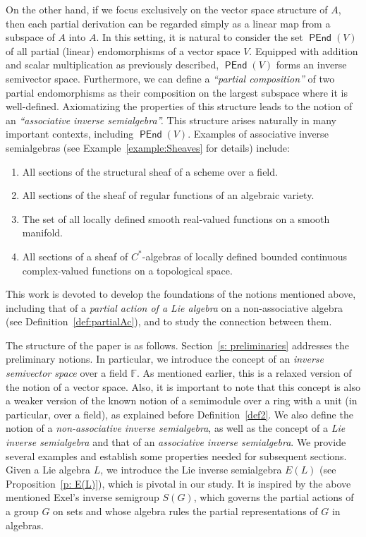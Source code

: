 \documentclass[10pt,a4paper]{amsart}
\theoremstyle{definition}
\theoremstyle{remark}
\numberwithin{equation}{section}
\newtheorem*{Theorem A}{\textbf{Theorem A}}
\newtheorem*{Corollary E}{\textbf{Corollary E}}
\newtheorem*{Corollary F}{\textbf{Corollary F}}
\newtheorem*{Theorem B}{\textbf{Theorem B}}
\newtheorem*{Theorem C}{\textbf{Theorem C}}
\newtheorem*{Theorem D}{\textbf{Theorem B}}
\newtheorem*{p a}{\textbf{Proof of  Theorem A}}
\newtheorem*{p b}{\textbf{Proof of Theorem B}}
\newtheorem*{p c}{\textbf{Proof of  Theorem C}}
\newtheorem*{p d}{\textbf{Proof of  Theorem D}}
\newcommand{\F}{\mathbb{F}}
\newcommand{\0}{{\vartheta}}
\DeclareMathOperator{\pen}{\textsf{PEnd}}
\begin{document}
On the other hand, if we focus exclusively on the vector space structure of $A$, then each partial derivation can be regarded simply as a linear map from a subspace of $A$ into $A$. In this setting, it is natural to consider the set $\pen(V)$ of all partial (linear) endomorphisms of a vector space $V.$ Equipped with addition and scalar multiplication as previously described, $\pen(V)$ forms an inverse semivector space. Furthermore, we can define a {\em ``partial composition''} of two partial endomorphisms as their composition on the largest subspace where it is well-defined. Axiomatizing the properties of this structure leads to the notion of an {\em ``associative inverse semialgebra''.} This structure arises naturally in many important contexts,  including  $\pen(V).$ Examples of associative inverse semialgebras (see Example~\ref{example:Sheaves} for details)
include:
\begin{enumerate}
\item  All sections of the structural sheaf of a scheme  over  a field.
\item All sections of the sheaf of regular functions of an algebraic variety.
\item The set of all locally defined smooth real-valued functions on a smooth manifold.
\item All sections of a sheaf of $C^*$-algebras of locally defined bounded continuous complex-valued functions on a topological space.
\end{enumerate}
 This work is devoted to develop the foundations of the notions mentioned above, including that  of  a \emph{partial action of a Lie algebra} on a non-associative algebra (see Definition~\ref{def:partialAc}), and to study the connection between them.

The structure of the paper is as follows. Section~\ref{s: preliminaries} addresses the preliminary notions. In particular, we introduce the concept of an \emph{inverse semivector space} over a field \( \F \). As mentioned earlier, this is a relaxed version of the notion of a vector space. Also, it is important to note that this concept is also a weaker version of the  known notion of a semimodule over a ring with a unit (in particular, over a field), as explained before Definition~\ref{def2}. We also  define the notion of a \emph{non-associative inverse semialgebra}, as well as the concept of a \emph{Lie inverse semialgebra} and that of an \emph{associative inverse semialgebra}. We provide several  examples  and establish some properties needed  for subsequent sections. Given a Lie algebra \( L \), we introduce the Lie inverse semialgebra \( E(L) \) (see Proposition~\ref{p: E(L)}), which is pivotal in our study.  It is inspired by the above mentioned Exel's inverse semigroup \( S(G) \),   which governs  the partial actions of a group  \( G \) on sets and whose algebra rules the partial representations of  \( G \) in algebras.
\end{document}
